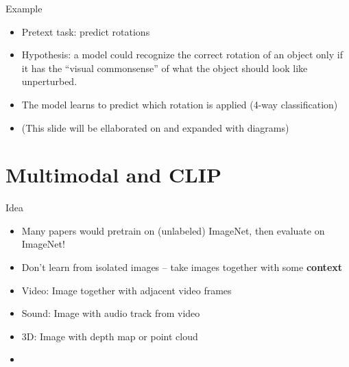 \documentclass[serif, aspectratio=169]{beamer}
\begin{document}
\begin{frame}{Example}
      \begin{itemize}
 \item Pretext task: predict rotations
\item  Hypothesis: a model could recognize the correct rotation of an object 
only if it has the “visual commonsense” of what the object should look 
like unperturbed.
\item The model learns to 
predict which rotation 
is applied (4-way 
classification)
\item (This slide will be ellaborated on and expanded with diagrams)

  \end{itemize}
\end{frame}

\section{Multimodal and CLIP}


\begin{frame}{Idea}
     
 \begin{itemize}
 \item    Many papers would pretrain on (unlabeled) ImageNet, then evaluate on ImageNet!
 \item  Don’t learn from isolated images -- take images together with some \textbf{context}
\item Video: Image together with adjacent video frames
 \item Sound: Image with audio track from video
 \item 3D: Image with depth map or point cloud
\item  \color{purple}{ Language: Image with natural-language text }

  \end{itemize}
\end{frame}
\end{document}
